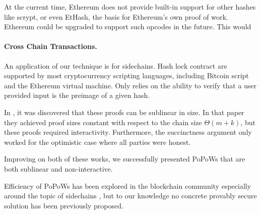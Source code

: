 At the current time, Ethereum does not provide built-in support for other hashes like scrypt, or even EtHash, the basis for Ethereum's own proof of work. Ethereum could be upgraded to support such opcodes in the future. This would 

\paragraph{Cross Chain Transactions.}
An application of our technique is for sidechains.
Hash lock contract are supported by most cryptocurrency scripting languages, including Bitcoin script and the Ethereum virtual machine. Only relies on the ability to verify that a user provided input is the preimage of a given hash.

In \cite{KLS}, it was discovered that these proofs can be sublinear in size. In
that paper they achieved proof sizes constant with respect to the chain size
$\Theta(m + k)$, but these proofs required interactivity. Furthermore, the
succinctness argument only worked for the optimistic case where all parties
were honest.

Improving on both of these works, we successfully presented PoPoWs that are
both sublinear and non-interactive.

Efficiency of PoPoWs has been explored in the blockchain community especially
around the topic of sidechains \cite{sidechains}, but to our knowledge no
concrete provably secure solution has been previously proposed.

